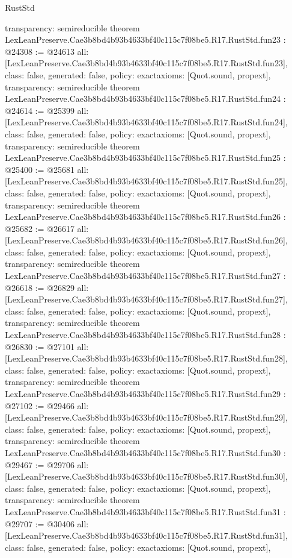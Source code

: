 \begin{lexlean}{RustStd}
\begin{coremodule}
{  transparency: semireducible
}
theorem LexLeanPreserve.Cae3b8bd4b93b4633bf40c115c7f08be5.R17.RustStd.fun23 : @24308 := @24613 {
  all: [LexLeanPreserve.Cae3b8bd4b93b4633bf40c115c7f08be5.R17.RustStd.fun23],
  class: false,
  generated: false,
  policy: exact{axioms: [Quot.sound, propext]},
  transparency: semireducible
}
theorem LexLeanPreserve.Cae3b8bd4b93b4633bf40c115c7f08be5.R17.RustStd.fun24 : @24614 := @25399 {
  all: [LexLeanPreserve.Cae3b8bd4b93b4633bf40c115c7f08be5.R17.RustStd.fun24],
  class: false,
  generated: false,
  policy: exact{axioms: [Quot.sound, propext]},
  transparency: semireducible
}
theorem LexLeanPreserve.Cae3b8bd4b93b4633bf40c115c7f08be5.R17.RustStd.fun25 : @25400 := @25681 {
  all: [LexLeanPreserve.Cae3b8bd4b93b4633bf40c115c7f08be5.R17.RustStd.fun25],
  class: false,
  generated: false,
  policy: exact{axioms: [Quot.sound, propext]},
  transparency: semireducible
}
theorem LexLeanPreserve.Cae3b8bd4b93b4633bf40c115c7f08be5.R17.RustStd.fun26 : @25682 := @26617 {
  all: [LexLeanPreserve.Cae3b8bd4b93b4633bf40c115c7f08be5.R17.RustStd.fun26],
  class: false,
  generated: false,
  policy: exact{axioms: [Quot.sound, propext]},
  transparency: semireducible
}
theorem LexLeanPreserve.Cae3b8bd4b93b4633bf40c115c7f08be5.R17.RustStd.fun27 : @26618 := @26829 {
  all: [LexLeanPreserve.Cae3b8bd4b93b4633bf40c115c7f08be5.R17.RustStd.fun27],
  class: false,
  generated: false,
  policy: exact{axioms: [Quot.sound, propext]},
  transparency: semireducible
}
theorem LexLeanPreserve.Cae3b8bd4b93b4633bf40c115c7f08be5.R17.RustStd.fun28 : @26830 := @27101 {
  all: [LexLeanPreserve.Cae3b8bd4b93b4633bf40c115c7f08be5.R17.RustStd.fun28],
  class: false,
  generated: false,
  policy: exact{axioms: [Quot.sound, propext]},
  transparency: semireducible
}
theorem LexLeanPreserve.Cae3b8bd4b93b4633bf40c115c7f08be5.R17.RustStd.fun29 : @27102 := @29466 {
  all: [LexLeanPreserve.Cae3b8bd4b93b4633bf40c115c7f08be5.R17.RustStd.fun29],
  class: false,
  generated: false,
  policy: exact{axioms: [Quot.sound, propext]},
  transparency: semireducible
}
theorem LexLeanPreserve.Cae3b8bd4b93b4633bf40c115c7f08be5.R17.RustStd.fun30 : @29467 := @29706 {
  all: [LexLeanPreserve.Cae3b8bd4b93b4633bf40c115c7f08be5.R17.RustStd.fun30],
  class: false,
  generated: false,
  policy: exact{axioms: [Quot.sound, propext]},
  transparency: semireducible
}
theorem LexLeanPreserve.Cae3b8bd4b93b4633bf40c115c7f08be5.R17.RustStd.fun31 : @29707 := @30406 {
  all: [LexLeanPreserve.Cae3b8bd4b93b4633bf40c115c7f08be5.R17.RustStd.fun31],
  class: false,
  generated: false,
  policy: exact{axioms: [Quot.sound, propext]},
}
\end{coremodule}
\end{lexlean}
